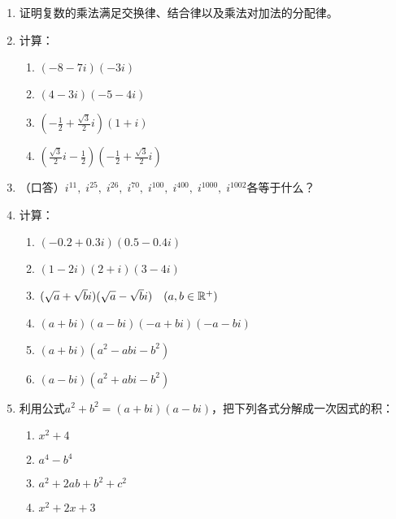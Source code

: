 \begin{enumerate}
    \item 证明复数的乘法满足交换律、结合律以及乘法对加法的分配律。
    \item  计算：
\begin{multicols}{2}
\begin{enumerate}[(1)]
    \item $(-8-7i)(-3i)$
    \item $(4-3i)(-5-4i)$
    \item $\left(-\frac{1}{2}+\frac{\sqrt{3}}{2}i\right)(1+i)$
    \item $\left(\frac{\sqrt{3}}{2}i-\frac{1}{2}\right)\left(-\frac{1}{2}+\frac{\sqrt{3}}{2}i\right)$
\end{enumerate}    
\end{multicols}

\item （口答）$i^{11},\; i^{25},\; i^{26},\; i^{70},\; i^{100},\; i^{400},\; i^{1000},\; i^{1002}$各等于什么？

\item 计算：
\begin{enumerate}[(1)]
\item $(-0.2+0.3i)(0.5-0.4i)$
\item $(1-2i)(2+i)(3-4i)$
\item $(\sqrt{a}+\sqrt{b}i)(\sqrt{a}-\sqrt{b}i)\quad (a,b\in\mathbb{R}^+)$
\item $(a+bi)(a-bi)(-a+bi)(-a-bi)$
\item $(a+bi)(a^2-abi-b^2)$
\item $(a-bi)(a^2+abi-b^2)$
\end{enumerate}

\item 
利用公式$a^2+b^2=(a+bi)(a-bi)$，把下列各式分解成一次因式的积：
\begin{multicols}{2}
\begin{enumerate}[(1)]
\item $x^2+4$
\item $a^4-b^4$
\item $a^2+2ab+b^2+c^2$
\item $x^2+2x+3$
\end{enumerate}
\end{multicols}


\end{enumerate}
